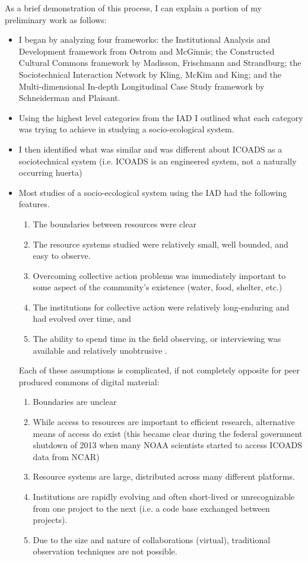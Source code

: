 \documentclass[thesis,tocnosub,noragright,centerchapter,12pt]{uiucecethesis09}
\begin{document}
{As a brief demonstration of this process, I can explain a portion of my preliminary work as follows:\\
\begin{itemize} 
\item  I began by analyzing four frameworks: the Institutional
Analysis and Development framework from Ostrom and McGinnis; the Constructed
Cultural Commons framework by Madisson, Frischmann and Strandburg; the
Sociotechnical Interaction Network by Kling, McKim and King; and the
Multi-dimensional In-depth Longitudinal Case Study framework by
Schneiderman and Plaisant.\\
\item 
Using the highest level categories from the IAD \citep{mcginnis2011introduction} I outlined what each category was trying to achieve in studying a socio-ecological system. 
\item
I then identified what was similar and was different about ICOADS as a sociotechnical system (i.e. ICOADS is an engineered system, not a naturally occurring huerta) 
\item 
Most studies of a socio-ecological system using the IAD had the following features.
\begin{enumerate}
\item
The boundaries between resources were clear 
\item
The resource systems studied were relatively small, well bounded, and easy to observe. 
\item
Overcoming collective action problems was immediately important to some aspect of the community's existence (water, food, shelter, etc.)
\item
The institutions for collective action were relatively long-enduring and had evolved over time, and 
\item
The ability to spend time in the field observing, or interviewing was available and relatively unobtrusive \citep[Quoted from][]{ostrom2011background}. 
\end{enumerate}

Each of these assumptions is complicated, if not completely opposite for peer produced commons of digital material: 
\begin{enumerate}
\item 
Boundaries are unclear 
\item
While access to resources are important to efficient research, alternative means of access do exist (this became clear during the federal government shutdown of 2013 when many NOAA scientists started to access ICOADS data from NCAR) 
\item
Resource systems are large, distributed across many different platforms.
\item
Institutions are rapidly evolving and often short-lived or unrecognizable from one project to the next (i.e. a code base exchanged between projects).
\item
Due to the size and nature of collaborations (virtual), traditional observation techniques are not possible.   
\end{enumerate}
\end{itemize}
\\

}
\end{document}
